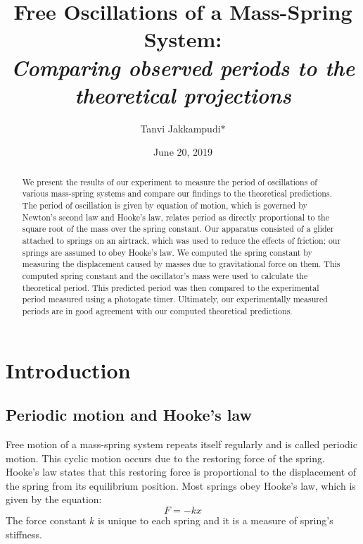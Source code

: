 





\title{Free Oscillations of a Mass-Spring System:\\{\it Comparing observed periods to the theoretical projections}}
\author{Tanvi Jakkampudi$*$\vspace{1mm}}
\date{June 20, 2019}


\begin{abstract}
We present the results of our experiment to measure the period of oscillations of various mass-spring systems and compare our findings to the theoretical predictions. The period of oscillation is given by equation of motion, which is governed by Newton's second law and Hooke's law, relates period as directly proportional to the square root of the mass over the spring constant. Our apparatus consisted of a glider attached to springs on an airtrack, which was used to reduce the effects of friction; our springs are assumed to obey Hooke's law. We computed the spring constant by measuring the displacement caused by masses due to gravitational force on them. This computed spring constant and the oscillator's mass were used to calculate the theoretical period. This predicted period was then compared to the experimental period measured using a photogate timer. Ultimately, our experimentally measured periods are in good agreement with our computed theoretical predictions.
\end{abstract}

\maketitle


\section{Introduction}
\subsection{Periodic motion and Hooke's law}
Free motion of a mass-spring system repeats itself regularly and is called periodic motion. This cyclic motion occurs due to the restoring force of the spring. Hooke's law states that this restoring force is proportional to the displacement of the spring from its equilibrium position. Most springs obey Hooke's law, which is given by the equation:
\begin{equation}
    F = -kx \label{eq:1a1}
\end{equation}
The force constant $k$ is unique to each spring and it is a measure of spring's stiffness.

